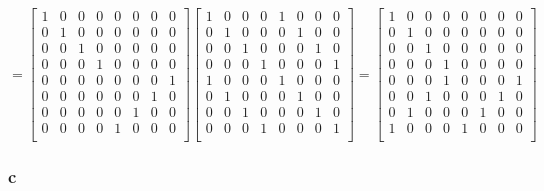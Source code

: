 \documentclass{../notatki}
\begin{document}
$$
=
\begin{bmatrix}
  1 & 0 & 0 & 0 & 0 & 0 & 0 & 0 \\
  0 & 1 & 0 & 0 & 0 & 0 & 0 & 0 \\
  0 & 0 & 1 & 0 & 0 & 0 & 0 & 0 \\
  0 & 0 & 0 & 1 & 0 & 0 & 0 & 0 \\
  0 & 0 & 0 & 0 & 0 & 0 & 0 & 1 \\
  0 & 0 & 0 & 0 & 0 & 0 & 1 & 0 \\
  0 & 0 & 0 & 0 & 0 & 1 & 0 & 0 \\
  0 & 0 & 0 & 0 & 1 & 0 & 0 & 0 \\
\end{bmatrix}
\begin{bmatrix}
  1 & 0 & 0 & 0 & 1 & 0 & 0 & 0 \\
  0 & 1 & 0 & 0 & 0 & 1 & 0 & 0 \\
  0 & 0 & 1 & 0 & 0 & 0 & 1 & 0 \\
  0 & 0 & 0 & 1 & 0 & 0 & 0 & 1 \\
  1 & 0 & 0 & 0 & 1 & 0 & 0 & 0 \\
  0 & 1 & 0 & 0 & 0 & 1 & 0 & 0 \\
  0 & 0 & 1 & 0 & 0 & 0 & 1 & 0 \\
  0 & 0 & 0 & 1 & 0 & 0 & 0 & 1 \\
\end{bmatrix}=
\begin{bmatrix}
  1 & 0 & 0 & 0 & 0 & 0 & 0 & 0 \\
  0 & 1 & 0 & 0 & 0 & 0 & 0 & 0 \\
  0 & 0 & 1 & 0 & 0 & 0 & 0 & 0 \\
  0 & 0 & 0 & 1 & 0 & 0 & 0 & 0 \\
  0 & 0 & 0 & 1 & 0 & 0 & 0 & 1 \\
  0 & 0 & 1 & 0 & 0 & 0 & 1 & 0 \\
  0 & 1 & 0 & 0 & 0 & 1 & 0 & 0 \\
  1 & 0 & 0 & 0 & 1 & 0 & 0 & 0 \\
\end{bmatrix}
$$

\subsubsection{c}
\end{document}
